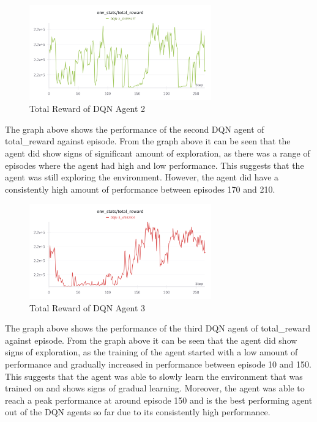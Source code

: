 \begin{figure}[H]
    \centering
    \includegraphics[width=0.7\textwidth]{figures/DQN-2_TotalReward.png}
    \caption{Total Reward of DQN Agent 2}
    \label{fig:agent_eval_dqn_2}
\end{figure}

The graph above shows the performance of the second DQN agent of total\_reward against episode. From the graph above it can be seen that the agent did show signs of significant amount of exploration, as there was a range of episodes where the agent had high and low performance. This suggests that the agent was still exploring the environment. However, the agent did have a consistently high amount of performance between episodes 170 and 210.

\begin{figure}[H]
    \centering
    \includegraphics[width=0.7\textwidth]{figures/DQN-3_TotalReward.png}
    \caption{Total Reward of DQN Agent 3}
    \label{fig:agent_eval_dqn_3}
\end{figure}

The graph above shows the performance of the third DQN agent of total\_reward against episode. From the graph above it can be seen that the agent did show signs of exploration, as the training of the agent started with a low amount of performance and gradually increased in performance between episode 10 and 150. This suggests that the agent was able to slowly learn the environment that was trained on and shows signs of gradual learning. Moreover, the agent was able to reach a peak performance at around episode 150 and is the best performing agent out of the DQN agents so far due to its consistently high performance. 

